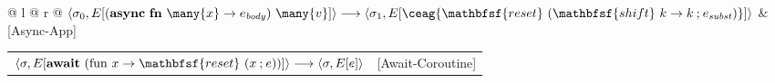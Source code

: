 \noindent
\begin{tabular*}{\linewidth}{@{} l @{\extracolsep{\fill}} r @{}}
$\langle \sigma_0, E[(\mathbf{async\ fn}\ \many{x} \to e_{\mathit{body}})\ \many{v}] \rangle \longrightarrow \langle \sigma_1, E[\ceag{\mathbfsf{reset}\ (\mathbfsf{shift}\ k \to k \mathbin{;} e_{\mathit{subst}})}] \rangle$ & [Async-App] \\
\end{tabular*}

\vspace{1.5em}

\noindent
\begin{tabular*}{\linewidth}{@{} l @{\extracolsep{\fill}} r @{}}
$\langle \sigma, E[\mathbf{await}\ (\mathrm{fun}\ x \to \mathbfsf{reset}\ (x \mathbin{;} e))] \rangle \longrightarrow \langle \sigma, E[e] \rangle$ & [Await-Coroutine]
\end{tabular*}
